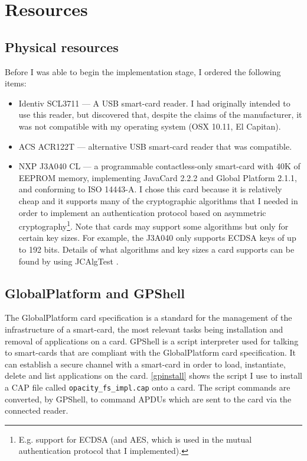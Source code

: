 \documentclass[12pt,a4paper,twoside,openright]{report}
\begin{document}
\section{Resources}



\subsection{Physical resources}

Before I was able to begin the implementation stage, I ordered the following items:

\begin{itemize}
\item Identiv SCL3711 --- A USB smart-card reader. I had originally intended to use this reader, but discovered that, despite the claims of the manufacturer, it was not compatible with my operating system (OSX 10.11, El Capitan).
\item ACS ACR122T --- alternative USB smart-card reader that was compatible.
\item NXP J3A040 CL --- a programmable contactless-only smart-card with 40K of EEPROM memory, implementing JavaCard 2.2.2 and Global Platform 2.1.1, and conforming to ISO 14443-A. I chose this card because it is relatively cheap and it supports many of the cryptographic algorithms that I needed in order to implement an authentication protocol based on asymmetric cryptography\footnote{E.g. support for ECDSA (and AES, which is used in the mutual authentication protocol that I implemented).}. Note that cards may support some algorithms but only for certain key sizes. For example, the J3A040 only supports ECDSA keys of up to 192 bits. Details of what algorithms and key sizes a card supports can be found by using JCAlgTest \cite{jcalgtest}.
\end{itemize}

\subsection{GlobalPlatform and GPShell}

The GlobalPlatform card specification is a standard for the management of the infrastructure of a smart-card, the most relevant tasks being installation and removal of applications on a card. GPShell \cite{gpshell} is a script interpreter used for talking to smart-cards that are compliant with the GlobalPlatform card specification. It can establish a secure channel with a smart-card in order to load, instantiate, delete and list applications on the card. \autoref{gpinstall} shows the script I use to install a CAP file called \texttt{opacity\_fs\_impl.cap} onto a card. The script commands are converted, by GPShell, to command APDUs which are sent to the card via the connected reader.
\end{document}
